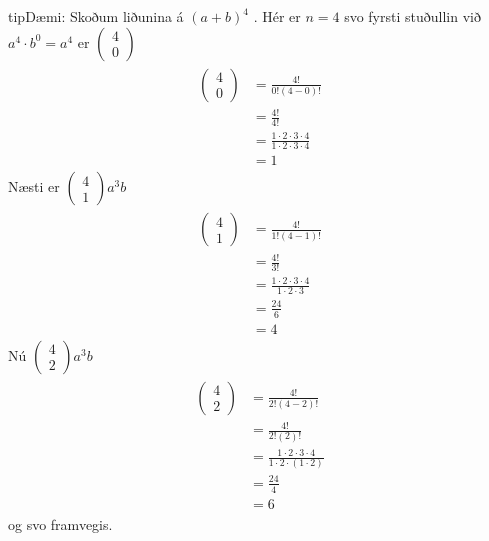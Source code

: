 \documentclass[a4paper,10pt,icelandic]{sphinxmanual}
\begin{document}
\begin{sphinxadmonition}{tip}{Dæmi:}
Skoðum liðunina á  \((a+b)^4\) . Hér er \(n=4\) svo fyrsti stuðullin við \(a^4\cdot b^0 = a^4\) er \(\begin{pmatrix} 4 \\ 0 \end{pmatrix}\)
\begin{equation*}
\begin{split}\begin{aligned}
 \begin{pmatrix} 4 \\ 0 \end{pmatrix} &= \frac{4!}{0!(4-0)!} \\
 &= \frac{4!}{4!}\\
 &= \frac{1\cdot 2\cdot 3\cdot 4}{1\cdot 2\cdot 3\cdot 4} \\
 &= 1
 \end{aligned}\end{split}
\end{equation*}
Næsti er \(\begin{pmatrix} 4 \\ 1 \end{pmatrix} a^3 b\)
\begin{equation*}
\begin{split}\begin{aligned}
 \begin{pmatrix} 4 \\ 1 \end{pmatrix} &= \frac{4!}{1!(4-1)!} \\
 &= \frac{4!}{3!}\\
 &= \frac{1\cdot 2 \cdot 3\cdot 4}{1\cdot 2\cdot 3} \\
 &= \frac{24}{6} \\
 &= 4
 \end{aligned}\end{split}
\end{equation*}
Nú  \(\begin{pmatrix} 4 \\ 2 \end{pmatrix} a^3 b\)
\begin{equation*}
\begin{split}\begin{aligned}
\begin{pmatrix} 4 \\ 2 \end{pmatrix} &= \frac{4!}{2!(4-2)!} \\
&= \frac{4!}{2!(2)!}\\
&= \frac{1\cdot 2\cdot 3\cdot 4}{1\cdot 2 \cdot(1 \cdot 2)} \\
&= \frac{24}{4} \\
&= 6
\end{aligned}\end{split}
\end{equation*}
og svo framvegis.


\end{sphinxadmonition}
\end{document}
